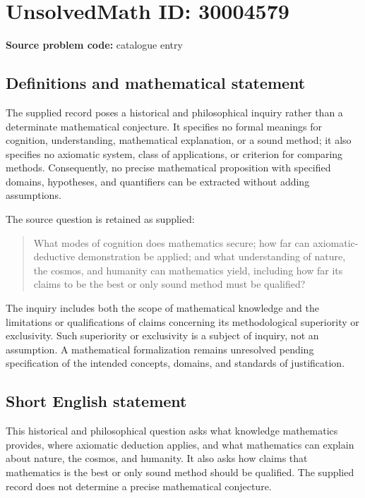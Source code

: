 \documentclass[11pt]{article}
\begin{document}
\section*{UnsolvedMath ID: 30004579}
\textbf{Source problem code:} catalogue entry
\subsection{Definitions and mathematical statement}
The supplied record poses a historical and philosophical inquiry rather than a determinate mathematical conjecture. It specifies no formal meanings for cognition, understanding, mathematical explanation, or a sound method; it also specifies no axiomatic system, class of applications, or criterion for comparing methods. Consequently, no precise mathematical proposition with specified domains, hypotheses, and quantifiers can be extracted without adding assumptions.

The source question is retained as supplied:
\begin{quote}
What modes of cognition does mathematics secure; how far can axiomatic-deductive demonstration be applied; and what understanding of nature, the cosmos, and humanity can mathematics yield, including how far its claims to be the best or only sound method must be qualified?
\end{quote}
The inquiry includes both the scope of mathematical knowledge and the limitations or qualifications of claims concerning its methodological superiority or exclusivity. Such superiority or exclusivity is a subject of inquiry, not an assumption. A mathematical formalization remains unresolved pending specification of the intended concepts, domains, and standards of justification.
\subsection{Short English statement}
This historical and philosophical question asks what knowledge mathematics provides, where axiomatic deduction applies, and what mathematics can explain about nature, the cosmos, and humanity. It also asks how claims that mathematics is the best or only sound method should be qualified. The supplied record does not determine a precise mathematical conjecture.
\end{document}
